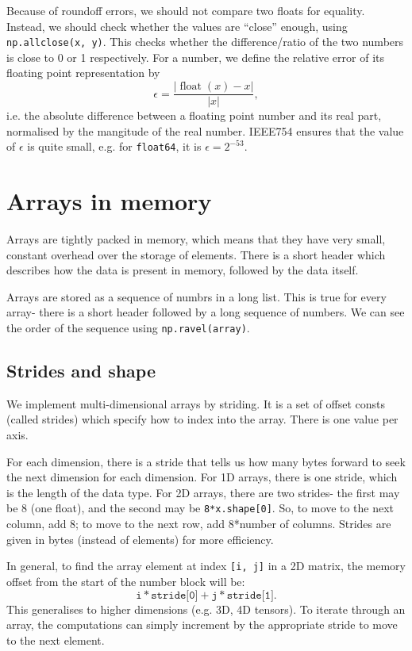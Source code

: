 \documentclass[a4paper, openany]{memoir}
\begin{document}
    Because of roundoff errors, we should not compare two floats for equality. Instead, we should check whether the values are ``close'' enough, using \texttt{np.allclose(x, y)}. This checks whether the difference/ratio of the two numbers is close to 0 or 1 respectively. For a number, we define the relative error of its floating point representation by
    \[\epsilon = \frac{|\operatorname{float}(x) - x|}{|x|},\]
    i.e. the absolute difference between a floating point number and its real part, normalised by the mangitude of the real number. IEEE754 ensures that the value of $\epsilon$ is quite small, e.g. for \texttt{float64}, it is $\epsilon = 2^{-53}$.

    \section{Arrays in memory}
    Arrays are tightly packed in memory, which means that they have very small, constant overhead over the storage of elements. There is a short header which describes how the data is present in memory, followed by the data itself.

    Arrays are stored as a sequence of numbrs in a long list. This is true for every array- there is a short header followed by a long sequence of numbers. We can see the order of the sequence using \texttt{np.ravel(array)}.

    \subsection{Strides and shape}
    We implement multi-dimensional arrays by striding. It is a set of offset consts (called strides) which specify how to index into the array. There is one value per axis.

    For each dimension, there is a stride that tells us how many bytes forward to seek the next dimension for each dimension. For 1D arrays, there is one stride, which is the length of the data type. For 2D arrays, there are two strides- the first may be 8 (one float), and the second may be \texttt{8*x.shape[0]}. So, to move to the next column, add 8; to move to the next row, add 8*number of columns. Strides are given in bytes (instead of elements) for more efficiency.

    In general, to find the array element at index \texttt{[i, j]} in a 2D matrix, the memory offset from the start of the number block will be:
    \[\texttt{i} * \texttt{stride[0]} + \texttt{j} * \texttt{stride[1]}.\]
    This generalises to higher dimensions (e.g. 3D, 4D tensors). To iterate through an array, the computations can simply increment by the appropriate stride to move to the next element.
\end{document}
